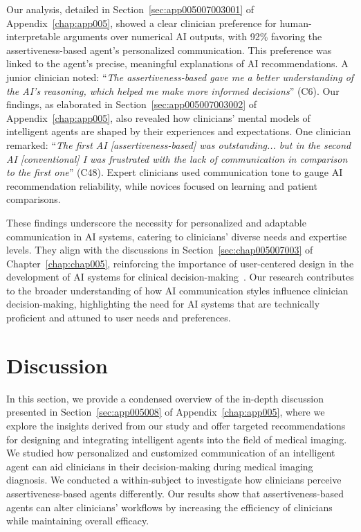 \textcolor{revised}{Our analysis, detailed in Section~\ref{sec:app005007003001} of Appendix~\ref{chap:app005}, showed a clear clinician preference for human-interpretable arguments over numerical \ac{AI} outputs, with 92\% favoring the assertiveness-based agent's personalized communication.
This preference was linked to the agent's precise, meaningful explanations of \ac{AI} recommendations.
A junior clinician noted: ``{\it The assertiveness-based gave me a better understanding of the \acs{AI}'s reasoning, which helped me make more informed decisions}'' (C6).
Our findings, as elaborated in Section~\ref{sec:app005007003002} of Appendix~\ref{chap:app005}, also revealed how clinicians' mental models of intelligent agents are shaped by their experiences and expectations.
One clinician remarked: ``{\it The first \acs{AI} [assertiveness-based] was outstanding... but in the second \acs{AI} [conventional] I was frustrated with the lack of communication in comparison to the first one}'' (C48).
Expert clinicians used communication tone to gauge \ac{AI} recommendation reliability, while novices focused on learning and patient comparisons.}

\textcolor{revised}{These findings underscore the necessity for personalized and adaptable communication in \ac{AI} systems, catering to clinicians' diverse needs and expertise levels.
They align with the discussions in Section~\ref{sec:chap005007003} of Chapter~\ref{chap:chap005}, reinforcing the importance of user-centered design in the development of \ac{AI} systems for clinical decision-making~\cite{10.1145/3491102.3517789}.
Our research contributes to the broader understanding of how \ac{AI} communication styles influence clinician decision-making, highlighting the need for \ac{AI} systems that are technically proficient and attuned to user needs and preferences.}

\section{Discussion}
\label{sec:chap006007}

In this section, we provide a condensed overview of the in-depth discussion presented in Section~\ref{sec:app005008} of Appendix~\ref{chap:app005}, where we explore the insights derived from our study and offer targeted recommendations for designing and integrating intelligent agents into the field of medical imaging.
We studied how personalized and customized communication of an intelligent agent can aid clinicians in their decision-making during medical imaging diagnosis.
We conducted a within-subject to investigate how clinicians perceive assertiveness-based agents differently.
Our results show that assertiveness-based agents can alter clinicians' workflows by increasing the efficiency of clinicians while maintaining overall efficacy.

